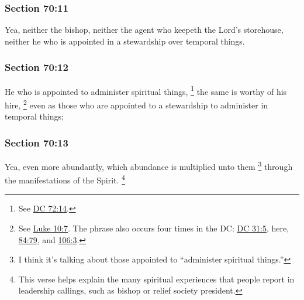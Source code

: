 	\subsubsection{Section 70:11} %
		\label{DC70-11}

		Yea, neither the bishop, neither the agent who keepeth the Lord's storehouse, neither he who is appointed in a stewardship over temporal things.


	\subsubsection{Section 70:12} %
		\label{DC70-12}

		He who is appointed to administer spiritual things,%
			\footnote{%
				See \hyperref[DC72-14]{DC 72:14}.
				}
		the same is worthy of his hire,%
			\footnote{%
				See \hyperref[LUKE-10-7]{Luke 10:7}. The phrase also occurs four times in the DC: \hyperref[DC31-5]{DC 31:5}, here, \hyperref[DC84-79]{84:79}, and \hyperref[DC106-3]{106:3}.
				}
		even as those who are appointed to a stewardship to administer in temporal things;


	\subsubsection{Section 70:13} %
		\label{DC70-13}

		Yea, even more abundantly, which abundance is multiplied unto them%
			\footnote{%
				I think it's talking about those appointed to ``administer spiritual things.''
				} 
		through the manifestations of the Spirit.%
			\footnote{%
				This verse helps explain the many spiritual experiences that people report in leadership callings, such as bishop or relief society president.
				}

